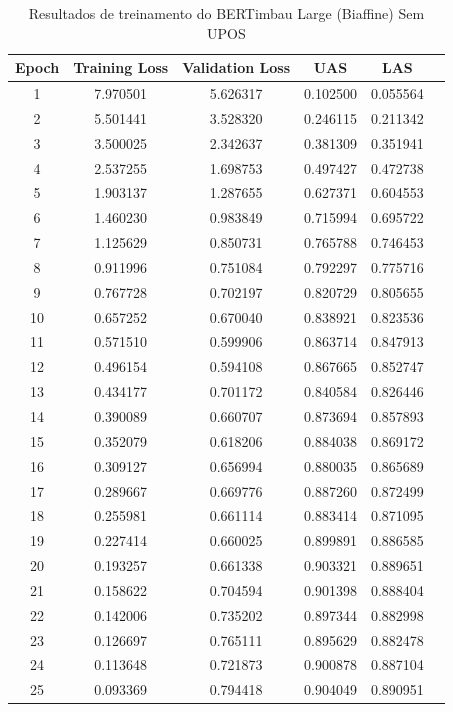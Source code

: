 \begin{table}[ht]
\centering
\caption{Resultados de treinamento do BERTimbau Large (Biaffine) Sem UPOS}
\label{tab:bertimbau-large-biaffine_sem_upos}
\begin{tabular}{c c c c c c}
\hline
\textbf{Epoch} & \textbf{Training Loss} & \textbf{Validation Loss} & \textbf{UAS} & \textbf{LAS} \\
\hline
1 & 7.970501 & 5.626317 & 0.102500 & 0.055564 \\
2 & 5.501441 & 3.528320 & 0.246115 & 0.211342 \\
3 & 3.500025 & 2.342637 & 0.381309 & 0.351941 \\
4 & 2.537255 & 1.698753 & 0.497427 & 0.472738 \\
5 & 1.903137 & 1.287655 & 0.627371 & 0.604553 \\
6 & 1.460230 & 0.983849 & 0.715994 & 0.695722 \\
7 & 1.125629 & 0.850731 & 0.765788 & 0.746453 \\
8 & 0.911996 & 0.751084 & 0.792297 & 0.775716 \\
9 & 0.767728 & 0.702197 & 0.820729 & 0.805655 \\
10 & 0.657252 & 0.670040 & 0.838921 & 0.823536 \\
11 & 0.571510 & 0.599906 & 0.863714 & 0.847913 \\
12 & 0.496154 & 0.594108 & 0.867665 & 0.852747 \\
13 & 0.434177 & 0.701172 & 0.840584 & 0.826446 \\
14 & 0.390089 & 0.660707 & 0.873694 & 0.857893 \\
15 & 0.352079 & 0.618206 & 0.884038 & 0.869172 \\
16 & 0.309127 & 0.656994 & 0.880035 & 0.865689 \\
17 & 0.289667 & 0.669776 & 0.887260 & 0.872499 \\
18 & 0.255981 & 0.661114 & 0.883414 & 0.871095 \\
19 & 0.227414 & 0.660025 & 0.899891 & 0.886585 \\
20 & 0.193257 & 0.661338 & 0.903321 & 0.889651 \\
21 & 0.158622 & 0.704594 & 0.901398 & 0.888404 \\
22 & 0.142006 & 0.735202 & 0.897344 & 0.882998 \\
23 & 0.126697 & 0.765111 & 0.895629 & 0.882478 \\
24 & 0.113648 & 0.721873 & 0.900878 & 0.887104 \\
25 & 0.093369 & 0.794418 & 0.904049 & 0.890951 \\

\end{tabular}
\end{table}
